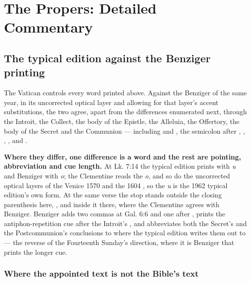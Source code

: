 \section*{The Propers: Detailed Commentary}

\subsection*{The typical edition against the Benziger printing}

The Vatican  controls every word printed above. Against the
Benziger  of the same year, in its uncorrected
optical layer and allowing for that layer's accent substitutions, the two agree, apart from the differences enumerated next, through
the Introit, the Collect, the body of the Epistle, the Alleluia, the Offertory,
the body of the Secret and the Communion --- including  and
, the semicolon after , , , ,  and .

\textbf{Where they differ, one difference is a word and the rest are pointing,
abbreviation and cue length.} At Lk. 7:14 the typical edition prints
 with \emph{u} and Benziger  with \emph{o};
the Clementine reads the \emph{o}, and so do the uncorrected optical layers of
the Venice 1570 and the 1604 , so the \emph{u} is the 1962 typical
edition's own form. At the same verse
the stop stands outside the closing parenthesis here, , and
inside it there, where the Clementine agrees with Benziger. Benziger adds two
commas at Gal. 6:6 and one after , prints the
antiphon-repetition cue  after the Introit's , and abbreviates both the Secret's and the Postcommunion's conclusions to
 where the typical edition writes them out to  --- the reverse of the Fourteenth Sunday's direction, where it is
Benziger that prints the longer cue.

\subsubsection*{Where the appointed text is not the Bible's text}

